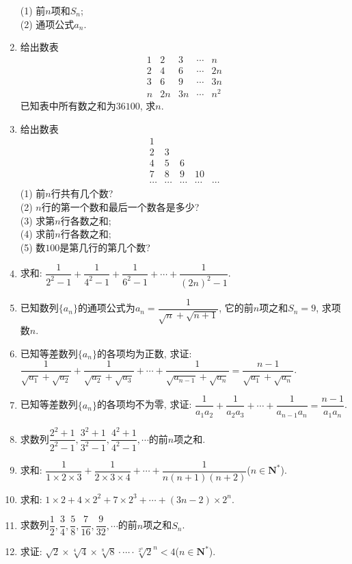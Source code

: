 \documentclass[10pt,a4paper]{article}
\begin{document}
\begin{enumerate}[1.]
(1) 前$n$项和$S_n$;\\
(2) 通项公式$a_n$.
\item 给出数表
\[\begin{array}{ccccc}
    1& 2& 3& \cdots& n\\
    2& 4& 6& \cdots& 2n\\
    3& 6& 9& \cdots& 3n\\
    n& 2n& 3n& \cdots& n^2
\end{array}\]
已知表中所有数之和为$36100$, 求$n$.
\item 给出数表
\[\begin{array}{lllll}
1 \\
2 & 3 \\
4 & 5 & 6 \\
7 & 8 & 9 & 10 \\
\cdots & \cdots & \cdots & \cdots & \cdots
\end{array}\]
(1) 前$n$行共有几个数?\\
(2) $n$行的第一个数和最后一个数各是多少?\\
(3) 求第$n$行各数之和;\\
(4) 求前$n$行各数之和;\\
(5) 数$100$是第几行的第几个数?
\item 求和: $\dfrac 1{2^2-1}+\dfrac 1{4^2-1}+\dfrac 1{6^2-1}+\cdots +\dfrac 1{(2n)^2-1}$.
\item 已知数列$\{a_n\}$的通项公式为$a_n=\dfrac 1{\sqrt n+\sqrt {n+1}}$, 它的前$n$项之和$S_n=9$, 求项数$n$.
\item 已知等差数列$\{a_n\}$的各项均为正数, 求证: $\dfrac 1{\sqrt {a_1}+\sqrt {a_2}}+\dfrac 1{\sqrt {a_2}+\sqrt {a_3}}+\cdots +\dfrac 1{\sqrt {a_{n-1}}+\sqrt {a_n}}=\dfrac{n-1}{\sqrt {a_1}+\sqrt {a_n}}$.
\item 已知等差数列$\{a_n\}$的各项均不为零, 求证: $\dfrac 1{a_1a_2}+\dfrac 1{a_2a_3}+\cdots +\dfrac 1{a_{n-1}a_n}=\dfrac{n-1}{{a_1}{a_n}}$.
\item 求数列$\dfrac{{2^2}+1}{{2^2}-1},\dfrac{{3^2}+1}{{3^2}-1},\dfrac{{4^2}+1}{{4^2}-1}, \cdots$的前$n$项之和.
\item 求和: $\dfrac 1{1\times 2\times 3}+\dfrac 1{2\times 3\times 4}+\cdots +\dfrac 1{n(n+1)(n+2)}$($n\in \mathbf{N}^*$).
\item 求和: $1\times 2+4\times 2^2+7\times 2^3+\cdots +(3n-2)\times 2^n$.
\item 求数列$\dfrac 12,\dfrac 34,\dfrac 58,\dfrac 7{16},\dfrac 9{32}, \cdots$的前$n$项之和$S_n$.
\item 求证: $\sqrt 2\times \sqrt[4]4\times \sqrt[8]8\cdot \cdots \cdot \sqrt[2^n]2^n<4$($n\in \mathbf{N}^*$).

\end{enumerate}
\end{document}
